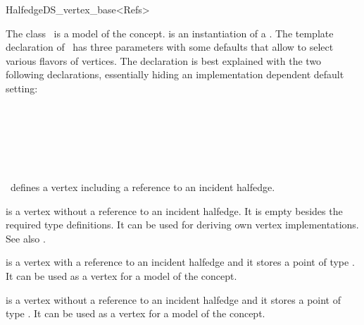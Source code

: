 
\ccRefPageBegin



\begin{ccRefClass}{HalfedgeDS_vertex_base<Refs>}

\ccDefinition
  
The class \ccRefName\ is a model of the 
concept.  is an instantiation of a .  The
template declaration of \ccRefName\ has three parameters with some
defaults that allow to select various flavors of vertices. The
declaration is best explained with the two following declarations,
essentially hiding an implementation dependent default setting:

~~~~~~\\
\mbox{}~~~~~~

~~~~~~\\
\mbox{}~~~~~~

\ccRefName\ defines a vertex including a reference to an incident halfedge.

 is a vertex
without a reference to an incident halfedge. It is empty besides the
required type definitions. It can be used for deriving own vertex
implementations. See also .

 is a vertex
with a reference to an incident halfedge and it stores a point of type
.  It can be used as a vertex for a model of the
 concept.

 is a vertex
without a reference to an incident halfedge and it stores a point of
type .  It can be used as a vertex for a model of the
 concept.


\end{ccRefClass}
